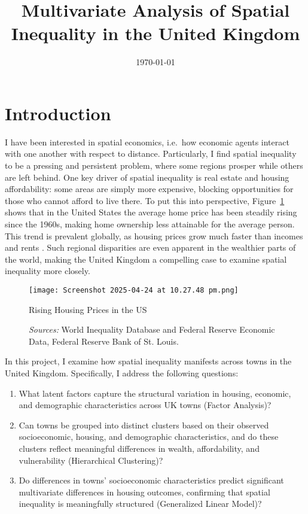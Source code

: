 \documentclass[12pt]{article}
\title{Multivariate Analysis of Spatial Inequality in the United Kingdom}
\date{\today}
\begin{document}
\onehalfspacing

\maketitle

\section{Introduction}
I have been interested in spatial economics, i.e.\ how economic agents interact with one another with respect to distance. Particularly, I find spatial inequality to be a pressing and persistent problem, where some regions prosper while others are left behind. One key driver of spatial inequality is real estate and housing affordability: some areas are simply more expensive, blocking opportunities for those who cannot afford to live there. To put this into perspective, Figure~\ref{fig:housingclimb} shows that in the United States the average home price has been steadily rising since the 1960s, making home ownership less attainable for the average person. This trend is prevalent globally, as housing prices grow much faster than incomes and rents \citep{Piketty2014}. Such regional disparities are even apparent in the wealthier parts of the world, making the United Kingdom a compelling case to examine spatial inequality more closely.

\begin{figure}[htbp]
  \centering
  \texttt{[image: Screenshot 2025-04-24 at 10.27.48 pm.png]}
  \caption{Rising Housing Prices in the US}
  \caption*{\textit{Sources:} World Inequality Database and Federal Reserve Economic Data, Federal Reserve Bank of St. Louis.}
  \label{fig:housingclimb}
\end{figure}

In this project, I examine how spatial inequality manifests across towns in the United Kingdom. Specifically, I address the following questions:
\begin{enumerate}
  \item What latent factors capture the structural variation in housing, economic, and demographic characteristics across UK towns (Factor Analysis)?
  \item Can towns be grouped into distinct clusters based on their observed socioeconomic, housing, and demographic characteristics, and do these clusters reflect meaningful differences in wealth, affordability, and vulnerability (Hierarchical Clustering)?
  \item Do differences in towns’ socioeconomic characteristics predict significant multivariate differences in housing outcomes, confirming that spatial inequality is meaningfully structured (Generalized Linear Model)?
\end{enumerate}
\end{document}
